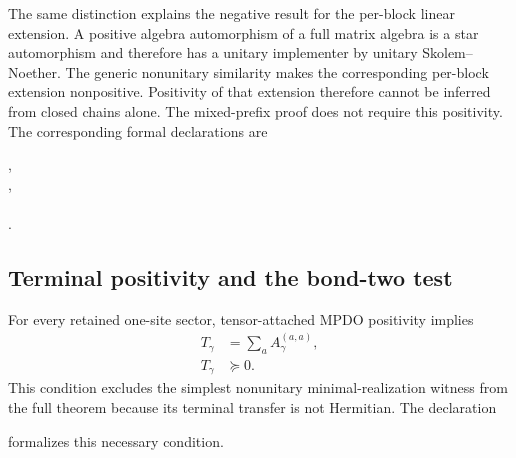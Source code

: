 \documentclass{article}
\begin{document}
The same distinction explains the negative result for the per-block linear
extension. A positive algebra automorphism of a full matrix algebra is a
star automorphism and therefore has a unitary implementer by unitary
Skolem--Noether. The generic nonunitary similarity makes the corresponding
per-block extension nonpositive. Positivity of that extension therefore
cannot be inferred from closed chains alone. The mixed-prefix proof does not
require this positivity. The corresponding formal declarations are
\begin{center}
\scriptsize
\mbox{,}\\
\mbox{,}\\
\mbox{}\\
\mbox{.}
\end{center}

\subsection{Terminal positivity and the bond-two test}

For every retained one-site sector, tensor-attached MPDO positivity implies
\begin{align}
    T_\gamma
    &=\sum_a A_\gamma^{(a,a)},
    \label{eq:cpsv16_two_site_sector_unitary_gauge_gap_terminal_sector_transfer_definition}\\
    T_\gamma
    &\succeq0.
    \label{eq:cpsv16_two_site_sector_unitary_gauge_gap_terminal_sector_transfer_positivity}
\end{align}
This condition excludes the simplest nonunitary minimal-realization witness
from the full theorem because its terminal transfer is not Hermitian. The
declaration
\begin{center}
\scriptsize
{}
\end{center}
formalizes this necessary condition.
\end{document}
